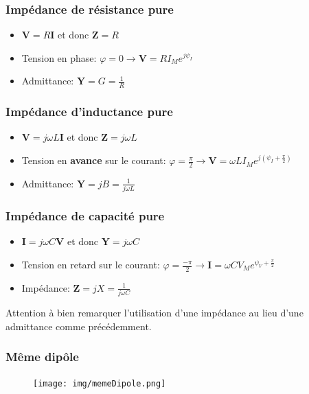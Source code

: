 \documentclass{report}
\begin{document}
\subsubsection{Impédance de résistance pure}
\begin{itemize}
\item $\textbf{V} = R \textbf{I}$ et donc $\textbf{Z} = R$
\item Tension en phase: $\varphi = 0 \rightarrow $\textbf{V}$ = R I_{M} e^{j \psi_{I}}$
\item Admittance: $\textbf{Y} = G = \frac{1}{R}$ 
\end{itemize}

\subsubsection{Impédance d'inductance pure}
\begin{itemize}
\item $\textbf{V} = j \omega L \textbf{I}$ et donc $\textbf{Z} = j \omega L$
\item Tension en \textbf{avance} sur le courant: $\varphi = \frac{\pi}{2} \rightarrow \textbf{V} = \omega L I_M e^{j(\psi_I + \frac{\pi}{2})}$
\item Admittance: $\textbf{Y} = jB = \frac{1}{j \omega L}$ 
\end{itemize}


\subsubsection{Impédance de capacité pure}
\begin{itemize}
\item $\textbf{I} = j \omega C \textbf{V}$ et donc $\textbf{Y} = j \omega C$
\item Tension en retard sur le courant: $\varphi = \frac{-\pi}{2} \rightarrow \textbf{I} = \omega C V_M e^{\psi_V + \frac{\pi}{2}}$
\item Impédance: $\textbf{Z} = jX = \frac{1}{j \omega C}$ 
\end{itemize}
Attention à bien remarquer l'utilisation d'une impédance au lieu d'une admittance comme précédemment.

\subsubsection{Même dipôle}
\begin{figure}[H]
\centering
\texttt{[image: img/memeDipole.png]}
\end{figure}
\end{document}
